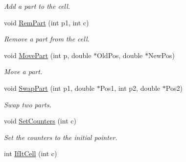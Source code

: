 \begin{DoxyCompactItemize}
\begin{DoxyCompactList}\small\item\em Add a part to the cell. \end{DoxyCompactList}\item 
void \hyperlink{classDdFixedSize_ae9da2e58e698bf5bcdca4f880d5579ff}{Rem\+Part} (int p1, int c)\hypertarget{classDdFixedSize_ae9da2e58e698bf5bcdca4f880d5579ff}{}\label{classDdFixedSize_ae9da2e58e698bf5bcdca4f880d5579ff}

\begin{DoxyCompactList}\small\item\em Remove a part from the cell. \end{DoxyCompactList}\item 
void \hyperlink{classDdFixedSize_a02a69943ed15121906bda20d9c89cb37}{Move\+Part} (int p, double $\ast$Old\+Pos, double $\ast$New\+Pos)\hypertarget{classDdFixedSize_a02a69943ed15121906bda20d9c89cb37}{}\label{classDdFixedSize_a02a69943ed15121906bda20d9c89cb37}

\begin{DoxyCompactList}\small\item\em Move a part. \end{DoxyCompactList}\item 
void \hyperlink{classDdFixedSize_ae468af31d1a530ba0fdaef088c4b9c00}{Swap\+Part} (int p1, double $\ast$Pos1, int p2, double $\ast$Pos2)\hypertarget{classDdFixedSize_ae468af31d1a530ba0fdaef088c4b9c00}{}\label{classDdFixedSize_ae468af31d1a530ba0fdaef088c4b9c00}

\begin{DoxyCompactList}\small\item\em Swap two parts. \end{DoxyCompactList}\item 
void \hyperlink{classDdFixedSize_aadd6f477626e28e8284b9db4649e841d}{Set\+Counters} (int c)\hypertarget{classDdFixedSize_aadd6f477626e28e8284b9db4649e841d}{}\label{classDdFixedSize_aadd6f477626e28e8284b9db4649e841d}

\begin{DoxyCompactList}\small\item\em Set the counters to the initial pointer. \end{DoxyCompactList}\item 
int \hyperlink{classDdFixedSize_af49812231dd30b603631791b87eba9f9}{If\+It\+Cell} (int c)\hypertarget{classDdFixedSize_af49812231dd30b603631791b87eba9f9}{}\label{classDdFixedSize_af49812231dd30b603631791b87eba9f9}


\end{DoxyCompactItemize}
